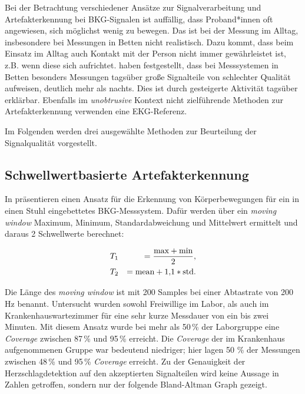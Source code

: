 	Bei der Betrachtung verschiedener Ansätze zur Signalverarbeitung und Artefakterkennung bei \ac{BKG}-Signalen ist auffällig, dass Proband*innen oft angewiesen, sich möglichst wenig zu bewegen. Das ist bei der Messung im Alltag, insbesondere bei Messungen in Betten nicht realistisch. Dazu kommt, dass beim Einsatz im Alltag auch Kontakt mit der Person nicht immer gewährleistet ist, z.B. wenn diese sich aufrichtet. \citeauthor{HoogAntink2020} haben festgestellt, dass bei Messsystemen in Betten besonders Messungen tagsüber große Signalteile von schlechter Qualität aufweisen, deutlich mehr als nachts. Dies ist durch gesteigerte Aktivität tagsüber erklärbar. Ebenfalls im \textit{unobtrusive} Kontext nicht zielführende Methoden zur Artefakterkennung verwenden eine \ac{EKG}-Referenz.
	
	Im Folgenden werden drei ausgewählte Methoden zur Beurteilung der Signalqualität vorgestellt.

	\subsection{Schwellwertbasierte Artefakterkennung}
	
	In  präsentieren \citeauthor{Pino2015} einen Ansatz für die Erkennung von Körperbewegungen für ein in einen Stuhl eingebettetes \ac{BKG}-Messsystem. Dafür werden über ein \textit{moving window} Maximum, Minimum, Standardabweichung und Mittelwert ermittelt und daraus 2 Schwellwerte berechnet:
	
	\begin{eqnarray*}
		&T_1 &= \frac{\text{max} + \text{min}}{2},\notag\\
		&T_2 &= \text{mean} + 1{,}1 * \text{std}.\notag
	\end{eqnarray*}
	
	Die Länge des \textit{moving window} ist mit 200 Samples bei einer Abtastrate von 200 Hz benannt. Untersucht wurden sowohl Freiwillige im Labor, als auch im Krankenhauswartezimmer für eine sehr kurze Messdauer von ein bis zwei Minuten. Mit diesem Ansatz wurde bei mehr als 50\,\% der Laborgruppe eine \textit{Coverage} zwischen 87\,\% und 95\,\% erreicht. Die \textit{Coverage} der im Krankenhaus aufgenommenen Gruppe war bedeutend niedriger; hier lagen 50 \% der Messungen zwischen 48\,\% und 95\,\% \textit{Coverage} erreicht. Zu der Genauigkeit der Herzschlagdetektion auf den akzeptierten Signalteilen wird keine Aussage in Zahlen getroffen, sondern nur der folgende Bland-Altman Graph gezeigt.
	

